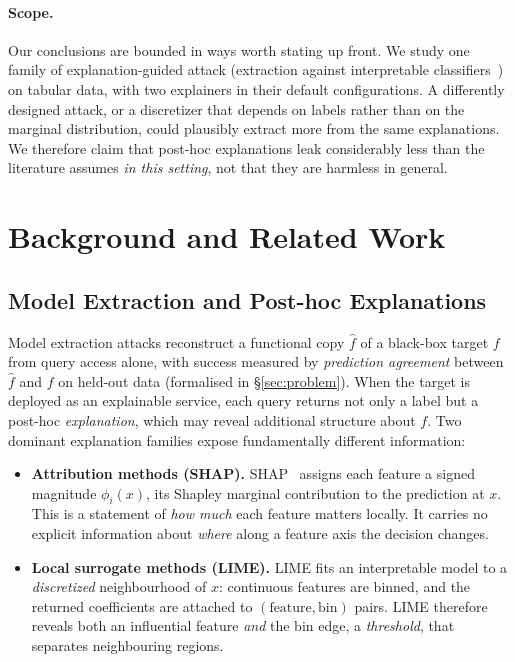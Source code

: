 \documentclass[sigconf,anonymous,review]{acmart}
\begin{document}
\paragraph{Scope.} Our conclusions are bounded in ways worth stating up front. We study one family of explanation-guided attack (extraction against interpretable
classifiers~\cite{oksuz2024autolycus}) on tabular data, with two explainers in their default
configurations. A differently designed attack, or a discretizer that depends on labels rather than on
the marginal distribution, could plausibly extract more from the same explanations. We therefore claim
that post-hoc explanations leak considerably less than the literature assumes \emph{in this setting},
not that they are harmless in general.

\section{Background and Related Work}
\label{sec:background}

\subsection{Model Extraction and Post-hoc Explanations}
\label{subsec:prelim}

Model extraction attacks reconstruct a functional copy $\hat{f}$ of a black-box
target $f$ from query access alone, with success measured by \emph{prediction
agreement} between $\hat{f}$ and $f$ on held-out data (formalised in
\S\ref{sec:problem}). When the target is deployed as an explainable service, each
query returns not only a label but a post-hoc \emph{explanation}, which may reveal
additional structure about $f$. Two dominant explanation families expose
fundamentally different information:

\begin{itemize}
  \item \textbf{Attribution methods (SHAP).} SHAP~\cite{lundberg2017shap} assigns
  each feature a signed magnitude $\phi_i(x)$, its Shapley marginal contribution
  to the prediction at $x$. This is a statement of \emph{how much} each feature matters locally. It carries no explicit information about \emph{where} along a
  feature axis the decision changes.
  \item \textbf{Local surrogate methods (LIME).} LIME fits an interpretable model
  to a \emph{discretized} neighbourhood of $x$: continuous features are binned, and
  the returned coefficients are attached to $(\text{feature}, \text{bin})$ pairs.
  LIME therefore reveals both an influential feature \emph{and} the bin edge, a \emph{threshold}, that separates neighbouring regions.
\end{itemize}
\end{document}
